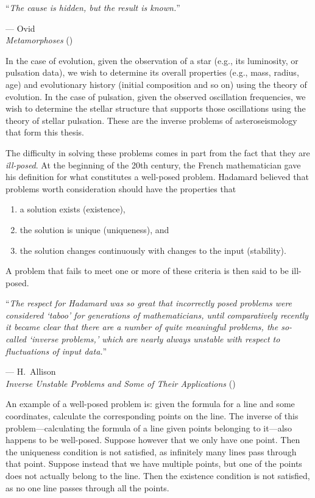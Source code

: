 \epigraph{``\emph{The cause is hidden, but the result is known.}''}{--- Ovid\\\emph{Metamorphoses} (\citeyear{ovid})}


In the case of evolution, given the observation of a star (e.g., its luminosity, or pulsation data), we wish to determine its overall properties (e.g., mass, radius, age) and evolutionary history (initial composition and so on) using the theory of evolution. 
In the case of pulsation, given the observed oscillation frequencies, we wish to determine the stellar structure that supports those oscillations using the theory of stellar pulsation. 
These are the inverse problems of asteroseismology that form this thesis. 





The difficulty in solving these problems comes in part from the fact that they are \emph{ill-posed}. 
At the beginning of the 20th century, the French mathematician  gave his definition for what constitutes a well-posed problem. 
Hadamard believed that problems worth consideration should have the properties that
\begin{enumerate}
    \item a solution exists (existence), 
    \item the solution is unique (uniqueness), and 
    \item the solution changes continuously with changes to the input (stability). 
\end{enumerate}
A problem that fails to meet one or more of these criteria is then said to be ill-posed. 

\epigraph{``\emph{The respect for Hadamard was so great that incorrectly posed problems were \hphantom{``}considered `taboo' for generations of mathematicians, until comparatively recently \hphantom{``}it became clear that there are a number of quite meaningful problems, the so-called \hphantom{``}`inverse problems,' which are nearly always unstable with respect to fluctuations \hphantom{``}of input data.}''}{--- H.\ Allison\\\emph{Inverse Unstable Problems and Some of Their Applications} (\citeyear{allison1979inverse})}

An example of a well-posed problem is: given the formula for a line and some coordinates, calculate the corresponding points on the line. 
The inverse of this problem---calculating the formula of a line given points belonging to it---also happens to be well-posed. 
Suppose however that we only have one point. 
Then the uniqueness condition is not satisfied, as infinitely many lines pass through that point. 
Suppose instead that we have multiple points, but one of the points does not actually belong to the line. 
Then the existence condition is not satisfied, as no one line passes through all the points. 


